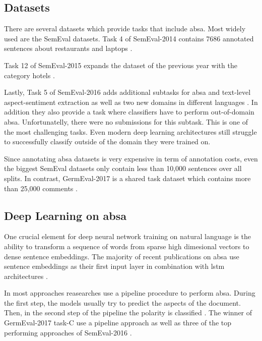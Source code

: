 \subsection{Datasets}

There are several datasets which provide tasks that include \gls{absa}. Most widely used are the SemEval datasets. Task 4 of SemEval-2014 contains 7686 annotated sentences about restaurants and laptops \cite{Pontiki2014}. 

Task 12 of SemEval-2015 expands the dataset of the previous year with the category hotels \cite{Pontiki2015a}. 

Lastly, Task 5 of SemEval-2016 adds additional subtasks for \gls{absa} and text-level aspect-sentiment extraction as well as two new domains in different languages \cite{Pontiki2015a}. In addition they also provide a task where classifiers have to perform out-of-domain \gls{absa}. Unfortunatelly, there were no submissions for this subtask. This is one of the most challenging tasks. Even modern deep learning architectures still struggle to successfully classify outside of the domain they were trained on.
\medskip

Since annotating \gls{absa} datasets is very expensive in term of annotation costs, even the biggest SemEval datasets only contain less than 10,000 sentences over all splits. In contrast, GermEval-2017 is a shared task dataset which contains more than 25,000 comments \cite{Wojatzki2017}.  

\subsection{Deep Learning on \gls{absa}}

One crucial element for deep neural network training on natural language is the ability to transform a sequence of words from sparse high dimesional vectors to dense sentence embeddings. The majority of recent publications on \gls{absa} use sentence embeddings as their first input layer \cite{Ruder2016, Tang2016, Lee2017, Schmitt2018, Ma2018, Xue2018} in combination with \gls{lstm} architectures \cite{Ruder2016, Tang2016, Ma2018}.
\medskip

In most approaches reasearches use a pipeline procedure to perform \gls{absa}. During the first step, the models usually try to predict the aspects of the document. Then, in the second step of the pipeline the polarity is classified \cite{Lakkaraju2014}. The winner of GermEval-2017 task-C use a pipeline approach \cite{Lee2017} as well as three of the top performing approaches of SemEval-2016 \cite{Brun2016, Kumar2016, Xenos2016}.
\medskip

